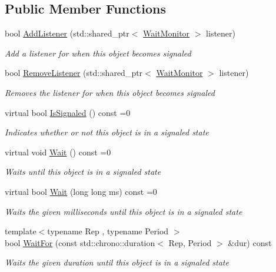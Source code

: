 \subsection*{Public Member Functions}
\begin{DoxyCompactItemize}
\item 
bool \mbox{\hyperlink{class_command_lib_1_1_waitable_afa4d25c0eb13db4222575f95036fbb22}{Add\+Listener}} (std\+::shared\+\_\+ptr$<$ \mbox{\hyperlink{class_command_lib_1_1_wait_monitor}{Wait\+Monitor}} $>$ listener)
\begin{DoxyCompactList}\small\item\em Add a listener for when this object becomes signaled\end{DoxyCompactList}\item 
bool \mbox{\hyperlink{class_command_lib_1_1_waitable_a4fcc6b508053a565565bc4fb591b7cf9}{Remove\+Listener}} (std\+::shared\+\_\+ptr$<$ \mbox{\hyperlink{class_command_lib_1_1_wait_monitor}{Wait\+Monitor}} $>$ listener)
\begin{DoxyCompactList}\small\item\em Removes the listener for when this object becomes signaled\end{DoxyCompactList}\item 
virtual bool \mbox{\hyperlink{class_command_lib_1_1_waitable_ac14826c4ad004a59113899b7a3f3ebcf}{Is\+Signaled}} () const =0
\begin{DoxyCompactList}\small\item\em Indicates whether or not this object is in a signaled state\end{DoxyCompactList}\item 
virtual void \mbox{\hyperlink{class_command_lib_1_1_waitable_aa3916ede3b2ca9bed013a4e256e081da}{Wait}} () const =0
\begin{DoxyCompactList}\small\item\em Waits until this object is in a signaled state\end{DoxyCompactList}\item 
virtual bool \mbox{\hyperlink{class_command_lib_1_1_waitable_ad5f9233b05a3ca2bce4ec572bfb82f4b}{Wait}} (long long ms) const =0
\begin{DoxyCompactList}\small\item\em Waits the given milliseconds until this object is in a signaled state\end{DoxyCompactList}\item 
{\footnotesize template$<$typename Rep , typename Period $>$ }\\bool \mbox{\hyperlink{class_command_lib_1_1_waitable_a798d6d18990d625773e0565acaa89fe3}{Wait\+For}} (const std\+::chrono\+::duration$<$ Rep, Period $>$ \&dur) const
\begin{DoxyCompactList}\small\item\em Waits the given duration until this object is in a signaled state\end{DoxyCompactList}\end{DoxyCompactItemize}
